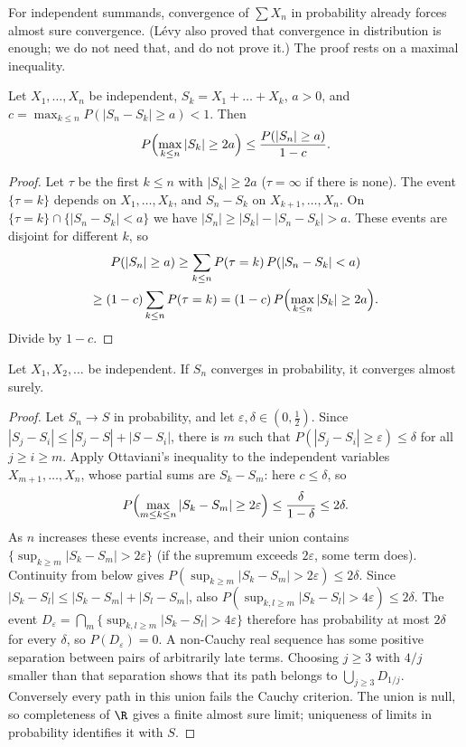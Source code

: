 For independent summands, convergence of $\sum X_n$ in probability already forces almost sure convergence. (L\'evy also proved
that convergence in distribution is enough; we do not need that, and do not prove it.) The proof rests on a maximal inequality.

\begin{lemma}\label{lem:ottaviani}
Let $X_1,\dots,X_n$ be independent, $S_k=X_1+\dots+X_k$, $a>0$, and $c=\max_{k\le n}P(|S_n-S_k|\ge a)<1$. Then
\[
P\Bigl(\max_{k\le n}|S_k|\ge2a\Bigr)\le\frac{P(|S_n|\ge a)}{1-c}.
\]
\end{lemma}
\begin{proof}
Let $\tau$ be the first $k\le n$ with $|S_k|\ge2a$ ($\tau=\infty$ if there is none). The event $\{\tau=k\}$ depends on
$X_1,\dots,X_k$, and $S_n-S_k$ on $X_{k+1},\dots,X_n$. On $\{\tau=k\}\cap\{|S_n-S_k|<a\}$ we have $|S_n|\ge|S_k|-|S_n-S_k|>a$.
These events are disjoint for different $k$, so
\[
\begin{gathered}
P(|S_n|\ge a)\ge\sum_{k\le n}P(\tau=k)\,P(|S_n-S_k|<a)\\\ge(1-c)\sum_{k\le n}P(\tau=k)=(1-c)\,P\Bigl(\max_{k\le n}|S_k|\ge2a\Bigr).
\end{gathered}
\]
Divide by $1-c$.
\end{proof}

\begin{theorem}[L\'evy, 1937]\label{thm:levyequiv}
Let $X_1,X_2,\dots$ be independent. If $S_n$ converges in probability, it converges almost surely.
\end{theorem}
\begin{proof}
Let $S_n\to S$ in probability, and let $\varepsilon,\delta\in(0,\frac12)$. Since $|S_j-S_i|\le|S_j-S|+|S-S_i|$, there is $m$
such that $P(|S_j-S_i|\ge\varepsilon)\le\delta$ for all $j\ge i\ge m$. Apply Ottaviani's inequality to the independent variables
$X_{m+1},\dots,X_n$, whose partial sums are $S_k-S_m$: here $c\le\delta$, so
\[
P\Bigl(\max_{m\le k\le n}|S_k-S_m|\ge2\varepsilon\Bigr)\le\frac{\delta}{1-\delta}\le2\delta.
\]
As $n$ increases these events increase, and their union contains $\{\sup_{k\ge m}|S_k-S_m|>2\varepsilon\}$ (if the supremum
exceeds $2\varepsilon$, some term does). Continuity from below gives $P(\sup_{k\ge m}|S_k-S_m|>2\varepsilon)\le2\delta$. Since
$|S_k-S_l|\le|S_k-S_m|+|S_l-S_m|$, also $P(\sup_{k,l\ge m}|S_k-S_l|>4\varepsilon)\le2\delta$. The
event $D_\varepsilon=\bigcap_m\{\sup_{k,l\ge m}|S_k-S_l|>4\varepsilon\}$ therefore has probability at most $2\delta$ for every
$\delta$, so $P(D_\varepsilon)=0$. A non-Cauchy real sequence has some positive separation between pairs of arbitrarily late terms. Choosing $j\ge3$ with $4/j$ smaller than that separation shows that its path belongs to $\bigcup_{j\ge3}D_{1/j}$. Conversely every path in this union fails the Cauchy criterion. The union is null, so completeness of $\R$ gives a finite almost sure limit; uniqueness of limits in probability identifies it with $S$.
\end{proof}

